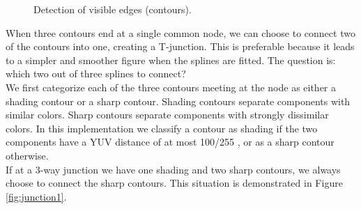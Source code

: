 \documentclass[]{usiinfbachelorproject}
\begin{document}
\begin{figure}[ht]
	\centering
	\caption{Detection of visible edges (contours).}
	\label{fig:visible}
\end{figure}

\noindent When three contours end at a single common node, we can choose to connect two of the contours into one, creating a T-junction. This is preferable because it leads to a simpler and smoother figure when the splines are fitted. The question is: which two out of three splines to connect?\\
We first categorize each of the three contours meeting at the node as either a shading contour or a sharp contour. Shading contours
separate components with similar colors. Sharp contours separate components with strongly dissimilar colors. In this implementation we classify a contour as shading if the two components have a YUV distance of at most 100/255 \cite{Kopf2011}, or as a sharp contour otherwise. \\
If at a 3-way junction we have one shading and two sharp contours, we always choose to connect the sharp contours. This situation is demonstrated in Figure \ref{fig:junction1}. 
\end{document}
